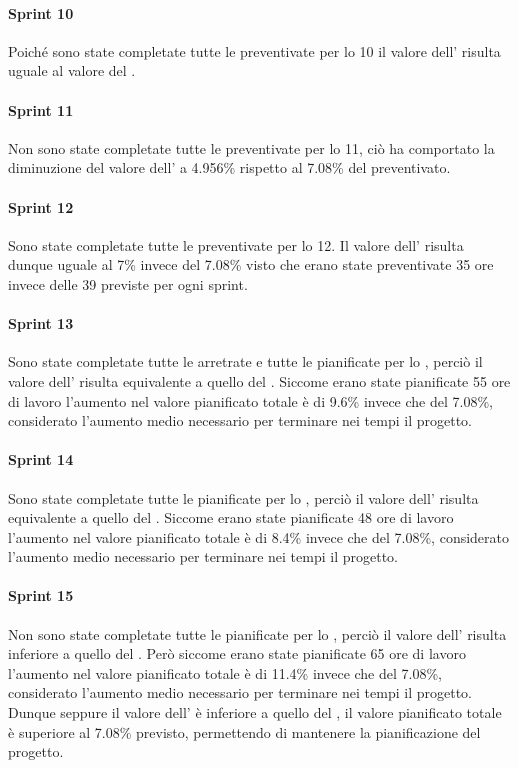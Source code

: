 \paragraph{Sprint 10}
Poiché sono state completate tutte le  preventivate per lo  10 il valore dell' risulta uguale al valore del .

\paragraph{Sprint 11}
Non sono state completate tutte le  preventivate per lo  11, ciò ha comportato la diminuzione del valore dell' a 4.956\% rispetto al 7.08\% del  preventivato.

\paragraph{Sprint 12}
Sono state completate tutte le  preventivate per lo  12. Il valore dell' risulta dunque uguale al 7\% invece del 7.08\% visto che erano state preventivate 35 ore invece delle 39 previste per ogni sprint.

\paragraph{Sprint 13}
Sono state completate tutte le  arretrate e tutte le  pianificate per lo , perciò il valore dell' risulta equivalente a quello del .
Siccome erano state pianificate 55 ore di lavoro l'aumento nel valore pianificato totale è di 9.6\% invece che del 7.08\%, considerato l'aumento medio necessario per terminare nei tempi il progetto.

\paragraph{Sprint 14}
Sono state completate tutte le  pianificate per lo , perciò il valore dell' risulta equivalente a quello del .
Siccome erano state pianificate 48 ore di lavoro l'aumento nel valore pianificato totale è di 8.4\% invece che del 7.08\%, considerato l'aumento medio necessario per terminare nei tempi il progetto.

\paragraph{Sprint 15}
Non sono state completate tutte le  pianificate per lo , perciò il valore dell' risulta inferiore a quello del .
Però siccome erano state pianificate 65 ore di lavoro l'aumento nel valore pianificato totale è di 11.4\% invece che del 7.08\%, considerato l'aumento medio necessario per terminare nei tempi il progetto.
Dunque seppure il valore dell' è inferiore a quello del , il valore pianificato totale è superiore al 7.08\% previsto, permettendo di mantenere la pianificazione del progetto.

